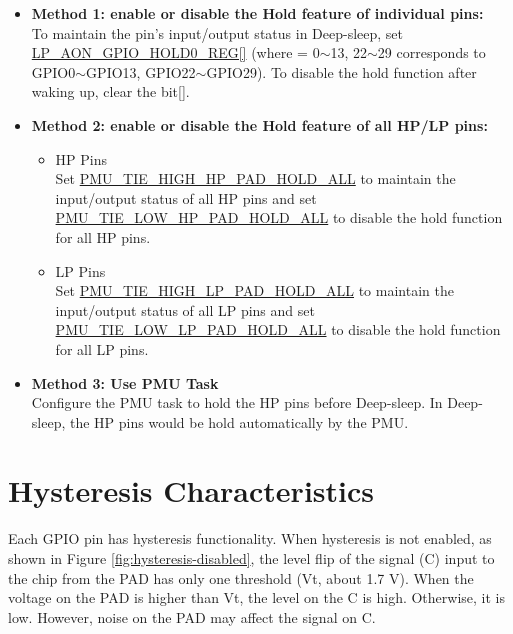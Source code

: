 \documentclass[main\_\_EN.tex]{subfiles}
\begin{document}
\begin{itemize}
    \item \textbf{Method 1: enable or disable the Hold feature of individual pins:}\\
    To maintain the pin's input/output status in Deep-sleep, set  \hyperref[regdesc:LPAONGPIOHOLD0REG]{LP\_AON\_GPIO\_HOLD0\_REG[]} (where  = 0$\sim$13, 22$\sim$29 corresponds to GPIO0$\sim$GPIO13, GPIO22$\sim$GPIO29). To disable the hold function after waking up, clear the bit[].
    \item \textbf{Method 2: enable or disable the Hold feature of all HP/LP pins:}\\
    \begin{itemize}
        \item HP Pins\\
        Set \hyperref[fielddesc:PMUTIEHIGHHPPADHOLDALL]{PMU\_TIE\_HIGH\_HP\_PAD\_HOLD\_ALL} to maintain the input/output status of all HP pins and set \hyperref[fielddesc:PMUTIELOWHPPADHOLDALL]{PMU\_TIE\_LOW\_HP\_PAD\_HOLD\_ALL} to disable the hold function for all HP pins.
        \item LP Pins\\
        Set \hyperref[fielddesc:PMUTIEHIGHLPPADHOLDALL]{PMU\_TIE\_HIGH\_LP\_PAD\_HOLD\_ALL} to maintain the input/output status of all LP pins and set \hyperref[fielddesc:PMUTIELOWLPPADHOLDALL]{PMU\_TIE\_LOW\_LP\_PAD\_HOLD\_ALL} to disable the hold function for all LP pins.
    \end{itemize}
    \item \textbf{Method 3: Use PMU Task}\\
    Configure the PMU task to hold the HP pins before Deep-sleep. In Deep-sleep, the HP pins would be hold automatically by the PMU.
\end{itemize}


\section{Hysteresis Characteristics}\label{sec:pad-hys-en}

Each GPIO pin has hysteresis functionality. When hysteresis is not enabled, as shown in Figure \ref{fig:hysteresis-disabled}, the level flip of the signal (C) input to the chip from the PAD has only one threshold (Vt, about 1.7 V). When the voltage on the PAD is higher than Vt, the level on the C is high. Otherwise, it is low. However, noise on the PAD may affect the signal on C.
\end{document}
